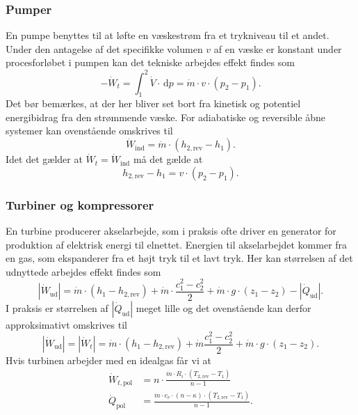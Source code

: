 \subsubsection{Pumper}
En pumpe benyttes til at løfte en væskestrøm fra et trykniveau til et andet. Under den antagelse af det specifikke volumen $v$ af en væske er konstant under procesforløbet i pumpen kan det tekniske arbejdes effekt findes som
\[ -
\dot{W}_t = \int_{1}^{2} \dot{V} \cdot \, \mathrm{d}p = \dot{m} \cdot v \cdot (p_2 - p_1)
.\]
Det bør bemærkes, at der her bliver set bort fra kinetisk og potentiel energibidrag fra den strømmende væske. For adiabatiske og reversible åbne systemer kan ovenstående omskrives til
\[ 
\dot{W}_{\text{ind}} = \dot{m} \cdot \left( h_{2, \text{rev}} - h_1 \right)
.\]
Idet det gælder at $\dot{W}_t = \dot{W}_{\text{ind}}$ må det gælde at
\[ 
h_{2, \text{rev}} - h_1 = v \cdot \left( p_2 - p_1 \right)
.\]

\subsubsection{Turbiner og kompressorer}
En turbine producerer akselarbejde, som i praksis ofte driver en generator for produktion af elektrisk energi til elnettet. Energien til akselarbejdet kommer fra en gas, som ekspanderer fra et højt tryk til et lavt tryk. Her kan størrelsen af det udnyttede arbejdes effekt findes som
\[ 
\left| \dot{W}_{\text{ud}} \right| = \dot{m} \cdot \left( h_1 - h_{2, \text{rev}} \right) + \dot{m} \cdot \frac{c_1^2 - c_2^2}{2} + \dot{m} \cdot g \cdot \left( z_1 - z_2 \right) - \left| \dot{Q}_{\text{ud}} \right|
.\]
I praksis er størrelsen af $\left| \dot{Q}_{\text{ud}} \right|$ meget lille og det ovenstående kan derfor approksimativt omskrives til
\[ 
\left| \dot{W}_{\text{ud}} \right| = \left| \dot{W}_t \right| = \dot{m} \cdot \left( h_1 - h_{2, \text{rev}} \right) + \dot{m} \frac{c_1^2 - c_2^2}{2} + \dot{m} \cdot g \cdot \left( z_1 - z_2 \right)
.\]
Hvis turbinen arbejder med en idealgas får vi at
\begin{align*}
  \dot{W}_{t, \text{pol}} &= n \cdot \frac{\dot{m} \cdot R_i \cdot \left( T_{2, \text{rev}} - T_1 \right)}{n - 1} \\
  \dot{Q}_{\text{pol}} &= \frac{\dot{m} \cdot c_v \cdot (n - \kappa) \cdot \left( T_{2, \text{rev}} - T_1 \right)}{n-1}
.\end{align*}

